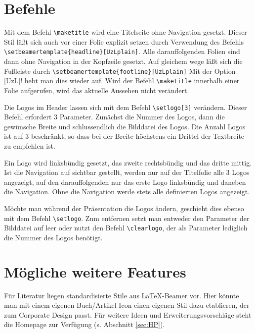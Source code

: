 \documentclass[a4paper,DIV=calc, oneside]{scrartcl}
\newcommand{\cmd}[1]{\marginpar{\color{UzLcolor}\textrm{#1}}}
\begin{document}
\section{Befehle}
Mit dem Befehl \lstinline!\maketitle!\cmd{\textbackslash maketitle} wird eine Titelseite ohne Navigation gesetzt. Dieser Stil läßt sich auch vor einer Folie explizit setzen durch Verwendung des Befehls\\ \lstinline!\setbeamertemplate{headline}[UzLplain]!\cmd{[UzLplain]}. Alle darauffolgenden Folien sind dann ohne Navigation in der Kopfzeile gesetzt. Auf gleichem wege läßt sich die Fußleiste durch \lstinline!\setbeamertemplate{footline}[UzLplain]! Mit der Option \lstinline!![UzL]! hebt man dies wieder auf.
Wird der Befehl \lstinline!\maketitle! innerhalb einer Folie aufgerufen, wird das aktuelle Aussehen nicht verändert.

Die Logos im Header lassen sich mit dem Befehl \lstinline!\setlogo[3]!\cmd{\textbackslash setlogo} verändern. Dieser Befehl erfordert 3 Parameter. Zunächst die Nummer des Logos, dann die gewünsche Breite und schlussendlich die Bilddatei des Logos. Die Anzahl Logos ist auf 3 beschränkt, so dass bei der Breite höchstens ein Drittel der Textbreite zu empfehlen ist.

Ein Logo wird linksbündig gesetzt, das zweite rechtsbündig und das dritte mittig. Ist die Navigation auf sichtbar gestellt, werden nur auf der Titelfolie alle 3 Logos angezeigt, auf den darauffolgenden nur das erste Logo linksbündig und daneben die Navigation. Ohne die Navigation werde stets alle definierten Logos angezeigt.

Möchte man während der Präsentation die Logos ändern, geschieht dies ebenso mit dem Befehl \lstinline!\setlogo!. Zum entfernen setzt man entweder den Parameter der Bilddatei auf leer oder nutzt den Befehl \lstinline!\clearlogo!\cmd{\textbackslash clearlogo}, der als Parameter lediglich die Nummer des Logos benötigt.

\section{Mögliche weitere Features}
Für Literatur liegen standardisierte Stile aus LaTeX-Beamer vor. Hier könnte man mit einem eigenen Buch/Artikel-Icon einen eigenen Stil dazu etablieren, der zum Corporate Design passt. Für weitere Ideen und Erweiterungsvorschläge steht die Homepage zur Verfügung (s. Abschnitt \ref{sec:HP}).
\end{document}
